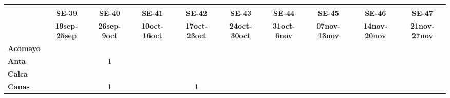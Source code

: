 \begin{tabular}{lccccccccc}
	\textbf{}              & \multicolumn{1}{l}{}                        & \multicolumn{1}{l}{}      & \multicolumn{1}{l}{}                         & \multicolumn{1}{l}{}                         & \multicolumn{1}{l}{}                         & \multicolumn{1}{l}{}                        & \multicolumn{1}{l}{}                         & \multicolumn{1}{l}{}                         & \multicolumn{1}{l}{}     \\
	\textbf{}                                                               
	&\textbf{SE-39}                   			 &\textbf{SE-40}                   
	&\textbf{SE-41}                              &\textbf{SE-42}                   &\textbf{SE-43}                  
	&\textbf{SE-44} 
	&\textbf{SE-45} 							&\textbf{SE-46} 
	&\textbf{SE-47}\\
	\textbf{}             
	&\textbf{19sep-25sep} 		   	   			&\textbf{26sep-9oct}  						&\textbf{10oct-16oct} 
	&\textbf{17oct-23oct} 						&\textbf{24oct-30oct} 		       &\textbf{31oct-6nov}  						&\textbf{07nov-13nov} 
	&\textbf{14nov-20nov} 						&\textbf{21nov-27nov}\\
	\textbf{Acomayo}                        	
	&\cellcolor[HTML]{FCC46C}          			&\cellcolor[HTML]{FCC46C}     	    		&\cellcolor[HTML]{FCC46C}                   &\cellcolor[HTML]{FCC46C}          			&\cellcolor[HTML]{FCC46C}                  
	&\cellcolor[HTML]{FCC46C}  			        &\cellcolor[HTML]{FCC46C}          &\cellcolor[HTML]{FCC46C} 					&\cellcolor[HTML]{FCC46C}\\
	\textbf{Anta}                                                                    
	&\cellcolor[HTML]{FCC46C}         			&1                   					
	& \cellcolor[HTML]{FCC46C}                  &\cellcolor[HTML]{FCC46C}         &\cellcolor[HTML]{FCC46C} 			    
	& \cellcolor[HTML]{FCC46C} 				    &\cellcolor[HTML]{FCC46C}		  &\cellcolor[HTML]{FCC46C}					&\cellcolor[HTML]{FCC46C}\\
	\textbf{Calca}      				       
	&\cellcolor[HTML]{FCC46C}         			&\cellcolor[HTML]{FCC46C}       
	&\cellcolor[HTML]{FCC46C}                   &\cellcolor[HTML]{FCC46C}         &\cellcolor[HTML]{FCC46C}                
	&\cellcolor[HTML]{FCC46C}                   &\cellcolor[HTML]{FCC46C}  		  &\cellcolor[HTML]{FCC46C} 					&\cellcolor[HTML]{FCC46C} \\                										
	\textbf{Canas}                              
	&\cellcolor[HTML]{FCC46C}         			&1                   &\cellcolor[HTML]{FCC46C}                   &1        			              &\cellcolor[HTML]{FCC46C}                   &\cellcolor[HTML]{FCC46C} 					&\cellcolor[HTML]{FCC46C}         			&\cellcolor[HTML]{FCC46C} 

\end{tabular}
